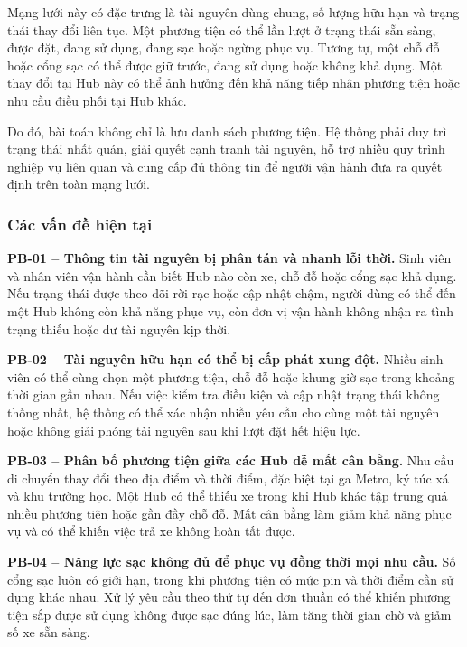 Mạng lưới này có đặc trưng là tài nguyên dùng chung, số lượng hữu hạn và trạng thái thay đổi liên tục. Một phương tiện có thể lần lượt ở trạng thái sẵn sàng, được đặt, đang sử dụng, đang sạc hoặc ngừng phục vụ. Tương tự, một chỗ đỗ hoặc cổng sạc có thể được giữ trước, đang sử dụng hoặc không khả dụng. Một thay đổi tại Hub này có thể ảnh hưởng đến khả năng tiếp nhận phương tiện hoặc nhu cầu điều phối tại Hub khác.

Do đó, bài toán không chỉ là lưu danh sách phương tiện. Hệ thống phải duy trì trạng thái nhất quán, giải quyết cạnh tranh tài nguyên, hỗ trợ nhiều quy trình nghiệp vụ liên quan và cung cấp đủ thông tin để người vận hành đưa ra quyết định trên toàn mạng lưới.

\subsubsection*{Các vấn đề hiện tại}

\noindent\textbf{PB-01 -- Thông tin tài nguyên bị phân tán và nhanh lỗi thời.}
Sinh viên và nhân viên vận hành cần biết Hub nào còn xe, chỗ đỗ hoặc cổng sạc khả dụng. Nếu trạng thái được theo dõi rời rạc hoặc cập nhật chậm, người dùng có thể đến một Hub không còn khả năng phục vụ, còn đơn vị vận hành không nhận ra tình trạng thiếu hoặc dư tài nguyên kịp thời.

\medskip
\noindent\textbf{PB-02 -- Tài nguyên hữu hạn có thể bị cấp phát xung đột.}
Nhiều sinh viên có thể cùng chọn một phương tiện, chỗ đỗ hoặc khung giờ sạc trong khoảng thời gian gần nhau. Nếu việc kiểm tra điều kiện và cập nhật trạng thái không thống nhất, hệ thống có thể xác nhận nhiều yêu cầu cho cùng một tài nguyên hoặc không giải phóng tài nguyên sau khi lượt đặt hết hiệu lực.

\medskip
\noindent\textbf{PB-03 -- Phân bố phương tiện giữa các Hub dễ mất cân bằng.}
Nhu cầu di chuyển thay đổi theo địa điểm và thời điểm, đặc biệt tại ga Metro, ký túc xá và khu trường học. Một Hub có thể thiếu xe trong khi Hub khác tập trung quá nhiều phương tiện hoặc gần đầy chỗ đỗ. Mất cân bằng làm giảm khả năng phục vụ và có thể khiến việc trả xe không hoàn tất được.

\medskip
\noindent\textbf{PB-04 -- Năng lực sạc không đủ để phục vụ đồng thời mọi nhu cầu.}
Số cổng sạc luôn có giới hạn, trong khi phương tiện có mức pin và thời điểm cần sử dụng khác nhau. Xử lý yêu cầu theo thứ tự đến đơn thuần có thể khiến phương tiện sắp được sử dụng không được sạc đúng lúc, làm tăng thời gian chờ và giảm số xe sẵn sàng.


